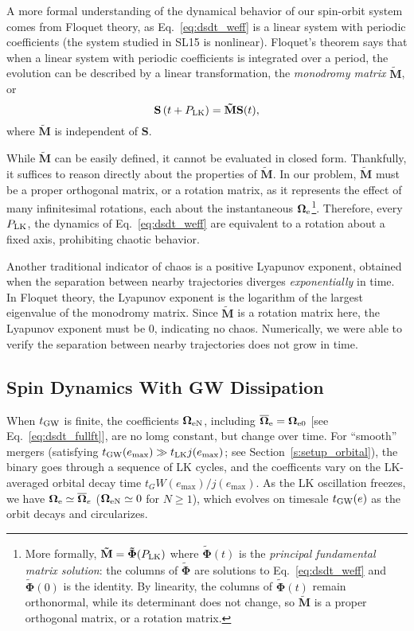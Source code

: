 \documentclass[
        twocolumn,
        twocolappendix
    ]{aastex63}
\renewcommand*{\bm}[1]{\boldsymbol{\mathbf{#1}}}
\newcommand*{\p}[1]{\left(#1\right)}
\begin{document}
A more formal understanding of the dynamical behavior of our spin-orbit system
comes from Floquet theory, as Eq.~\eqref{eq:dsdt_weff} is a linear system with
periodic coefficients (the system studied in SL15 is nonlinear). Floquet's
theorem says that when a linear system with periodic coefficients is integrated
over a period, the evolution can be described by a linear transformation, the
\emph{monodromy matrix} $\bm{\tilde{M}}$, or
\begin{equation}
    \bm{S}\p{t + P_{\rm LK}} = \bm{\tilde{M}} \bm{S}(t),
\end{equation}
where $\bm{\tilde{M}}$ is independent of $\bm{S}$.

While $\bm{\tilde{M}}$ can be easily defined, it cannot be evaluated in closed
form. Thankfully, it suffices to reason directly about the properties of
$\bm{\tilde{M}}$. In our problem, $\bm{\tilde{M}}$ must be a proper orthogonal
matrix, or a rotation matrix, as it represents the effect of many infinitesimal
rotations, each about the instantaneous $\bm{\Omega}_{\rm e}$\footnote{More
formally, $\bm{\tilde{M}} = \bm{\tilde{\Phi}}(P_{\rm LK})$ where
$\bm{\tilde{\Phi}}(t)$ is the \emph{principal fundamental matrix solution}: the
columns of $\bm{\tilde{\Phi}}$ are solutions to Eq.~\eqref{eq:dsdt_weff} and
$\bm{\tilde{\Phi}}(0)$ is the identity. By linearity, the columns of
$\bm{\tilde{\Phi}}(t)$ remain orthonormal, while its determinant does not
change, so $\bm{\tilde{M}}$ is a proper orthogonal matrix, or a rotation
matrix.}. Therefore, every $P_{\rm LK}$, the dynamics of
Eq.~\eqref{eq:dsdt_weff} are equivalent to a rotation about a fixed axis,
prohibiting chaotic behavior.

Another traditional indicator of chaos is a positive Lyapunov exponent, obtained
when the separation between nearby trajectories diverges \emph{exponentially} in
time. In Floquet theory, the Lyapunov exponent is the logarithm of the largest
eigenvalue of the monodromy matrix. Since $\bm{\tilde{M}}$ is a rotation matrix
here, the Lyapunov exponent must be $0$, indicating no chaos. Numerically, we
were able to verify the separation between nearby trajectories does not grow in
time.

\subsection{Spin Dynamics With GW Dissipation}

When $t_{\rm GW}$ is finite, the coefficients $\bm{\Omega}_{\rm eN}$, including
$\bm{\overline{\Omega}}_{\rm e} = \bm{\Omega}_{\rm e0}$ [see
Eq.~\eqref{eq:dsdt_fullft}], are no lomg constant, but change over time. For
``smooth'' mergers (satisfying $t_{\rm GW}(e_{\max}) \gg t_{\rm LK}
j(e_{\max})$; see Section~\ref{s:setup_orbital}), the binary goes through a
sequence of LK cycles, and the coefficents vary on the LK-averaged orbital decay
time $t_GW(e_{\max}) / j(e_{\max})$. As the LK oscillation freezes, we have
$\bm{\Omega}_{\rm e} \simeq \bm{\overline{\Omega}}_e$ ($\bm{\Omega}_{\rm eN}
\simeq 0$ for $N \geq 1$), which evolves on timesale $t_{\rm GW}(e)$ as the
orbit decays and circularizes.
\end{document}
